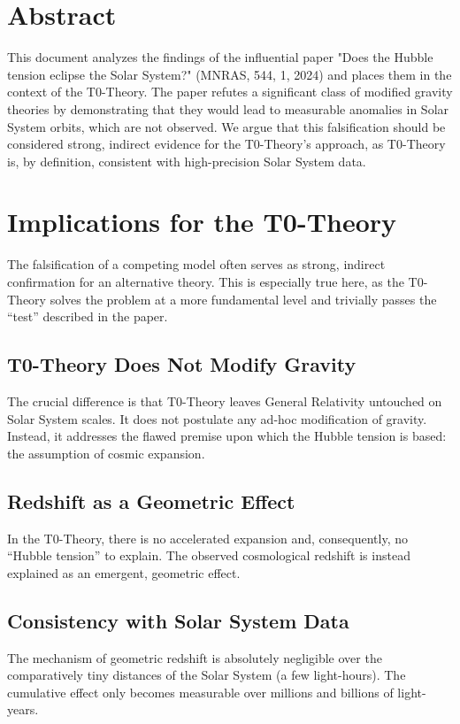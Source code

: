 \section*{Abstract}
		This document analyzes the findings of the influential paper "Does the Hubble tension eclipse the Solar System?" (MNRAS, 544, 1, 2024) \cite{nathan2024} and places them in the context of the T0-Theory. The paper refutes a significant class of modified gravity theories by demonstrating that they would lead to measurable anomalies in Solar System orbits, which are not observed. We argue that this falsification should be considered strong, indirect evidence for the T0-Theory's approach, as T0-Theory is, by definition, consistent with high-precision Solar System data.

	
	
	\section{Implications for the T0-Theory}
	
	The falsification of a competing model often serves as strong, indirect confirmation for an alternative theory. This is especially true here, as the T0-Theory solves the problem at a more fundamental level and trivially passes the ``test'' described in the paper.
	
	\subsection{T0-Theory Does Not Modify Gravity}
	The crucial difference is that T0-Theory leaves General Relativity untouched on Solar System scales. It does not postulate any ad-hoc modification of gravity. Instead, it addresses the flawed premise upon which the Hubble tension is based: the assumption of cosmic expansion.
	
	\subsection{Redshift as a Geometric Effect}
	In the T0-Theory, there is no accelerated expansion and, consequently, no ``Hubble tension'' to explain. The observed cosmological redshift is instead explained as an emergent, geometric effect.

	
	\subsection{Consistency with Solar System Data}
	The mechanism of geometric redshift is absolutely negligible over the comparatively tiny distances of the Solar System (a few light-hours). The cumulative effect only becomes measurable over millions and billions of light-years.
	
